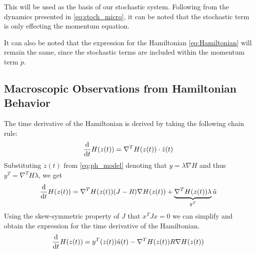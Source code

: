 This will be used as the basis of our stochastic system. Following from the dynamics presented in \autoref{eq:stoch_micro}, it can be noted that the stochastic term is only effecting the momentum equation.

It can also be noted that the expression for the Hamiltonian \autoref{eq:Hamiltonian} will remain the same, since the stochastic terms are included within the momentum term $\dot p$. 

\subsection{Macroscopic Observations from Hamiltonian Behavior}
\label{section:stoch_derivative}

The time derivative of the Hamiltonian is derived by taking the following chain rule:
\begin{align*}
    \dfrac{\mathrm d }{\mathrm d t}H(z(t)) = \nabla^T H(z(t))\cdot \dot z(t)
\end{align*}
Substituting $\dot z(t)$ from \autoref{eq:ph_model} denoting that $y = \lambda \nabla H$ and thus $y^T = \nabla^T H \lambda$, we get
\begin{align*}
    \dfrac{\mathrm d }{\mathrm d t}H(z(t)) = \nabla^T H(z(t))(J-R)\nabla H(z(t)) + \underbrace{\nabla^T H(z(t)) \lambda}_{y^T} \tilde u
\end{align*}
Using the skew-symmetric property of $J$ that $x^TJx=0$ we can simplify and obtain the expression for the time derivative of the Hamiltonian.
\begin{align}
    \frac{\mathrm d }{\mathrm d t}H(z(t)) = y^T(z(t))\tilde u(t) - \nabla^T H(z(t))R \nabla H(z(t))
\end{align}

